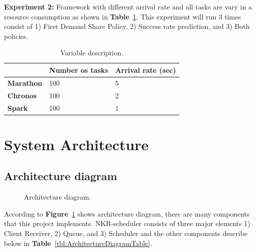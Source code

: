 \documentclass[12pt,oneside,openright,a4paper]{cpe-english-project}
\begin{document}
\textbf{Experiment 2:} Framework with different arrival rate and all tasks are vary in a resource consumption as shown in \textbf{Table}~\ref{tbl:Experiment2}. This experiment will run 3 times consist of 1) First Demand Share Policy, 2) Success rate prediction, and 3) Both policies.

\begin{table}[!h]
  \caption{Variable description.}\label{tbl:Experiment2}
  \begin{tabular}{|l|l|l|}
    \hline
    & \textbf{Number os tasks} & \textbf{Arrival rate (sec)}\\
    \hline
    \textbf{Marathon} & 100 & 5\\
    \hline
    \textbf{Chronos} & 100 & 2 \\
    \hline
    \textbf{Spark} & 100 & 1 \\
    \hline
  \end{tabular}
\end{table}

\section{System Architecture}

\subsection{Architecture diagram}  

\begin{figure}[!h]\centering
  \setlength{\fboxrule}{0mm} %
  \setlength{\fboxsep}{0cm}
  \caption{Architecture diagram.}\label{fig:ArchitectureDiagram}
\end{figure}

According to \textbf{Figure}~\ref{fig:ArchitectureDiagram} shows architecture diagram, there are many components that this project implements. NKR-scheduler consists of three major elements 1) Client Receiver, 2) Queue, and 3) Scheduler and the other components describe below in \textbf{Table}~\ref{tbl:ArchitectureDiagramTable}.
\end{document}
